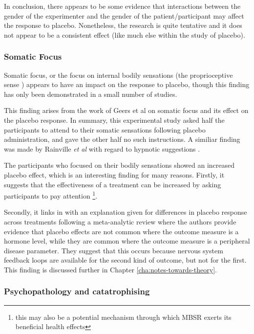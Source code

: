 In conclusion, there appears to be some evidence that interactions between the gender of the experimenter and the gender of the patient/participant may affect the response to placebo. Nonetheless, the research is quite tentative and it does not appear to be a consistent effect (like much else within the study of placebo). 



\subsubsection{Somatic Focus}

Somatic focus, or the focus on internal bodily sensations (the proprioceptive sense ) appears to have an impact on the response to placebo, though this finding has only been demonstrated in a small number of studies. 

This finding arises from the work of Geers et al \cite{Geers2006}  on somatic focus and its effect on the placebo response. In summary, this experimental study asked half the participants to attend to their somatic sensations following placebo administration, and gave the other half no such instructions. A similiar finding was made by Rainville \textit{et al} with regard to hypnotic suggestions \cite{Price2008}. 

The participants who focused on their bodily sensations showed an increased placebo effect, which is an interesting finding for many reasons. Firstly, it suggests that the effectiveness of a treatment can be increased by asking participants to pay attention \footnote{this may also be a potential mechanism through which MBSR exerts its beneficial health effects}. 

Secondly, it links in with an explanation given for differences in placebo response across treatments following a meta-analytic review \cite{Meissner2007} where the authors provide evidence that placebo effects are not common where the outcome measure is a hormone level, while they are common where the outcome measure is a peripheral disease parameter. They suggest that this occurs because nervous system feedback loops are available for the second kind of outcome, but not for the first. This finding is discussed further in Chapter \ref{cha:notes-towards-theory}.  

\subsubsection{Psychopathology and catatrophising}
\label{sec:psych-catatr}



